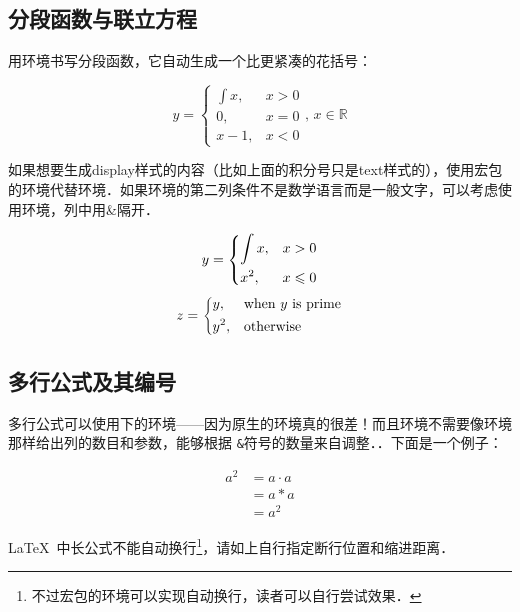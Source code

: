 \subsection{分段函数与联立方程}
用环境书写分段函数，它自动生成一个比更紧凑的花括号：

\begin{codeshow}
\[y=\begin{cases}
\int x, & x>0 \\
0,   & x=0 \\
x-1, & x<0
\end{cases},\,x\in\mathbb{R}\]
\end{codeshow}

如果想要生成display样式的内容（比如上面的积分号只是text样式的），使用宏包的环境代替环境．如果环境的第二列条件不是数学语言而是一般文字，可以考虑使用环境，列中用\&{}隔开．

\begin{codeshow}
\[y=\begin{dcases}
  \int x, & x>0 \\
  x^2, & x\leqslant 0
  \end{dcases}\]
\[z=\begin{dcases*}
  y, & when $y$ is prime\\
  y^2, & otherwise
  \end{dcases*}\]
\end{codeshow}

\subsection{多行公式及其编号}
\label{subsec:multieqnum}
多行公式可以使用下的环境——因为原生的环境真的很差！而且环境不需要像环境那样给出列的数目和参数，能够根据
\texttt{\&}符号的数量来自调整．．下面是一个例子：

\begin{codeshow}
\begin{align}
  a^2  &= a\cdot a \\
       &= a*a      \\
       &= a^2
\end{align}
\end{codeshow}

\LaTeX\ 中长公式不能自动换行\footnote{不过宏包的环境可以实现自动换行，读者可以自行尝试效果．}，请如上自行指定断行位置和缩进距离．

